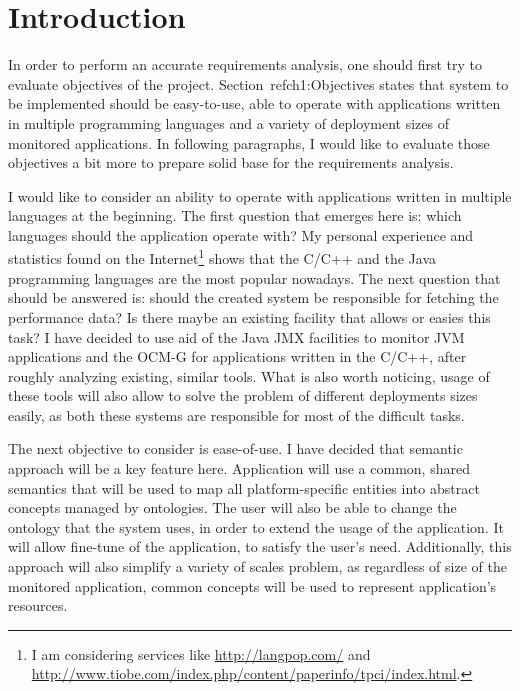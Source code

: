 %

\section{Introduction}
\label{sec:RequirementsIntroduction}

In order to perform an accurate requirements analysis, one should first try to evaluate objectives of the project. Section~ref{ch1:Objectives} states that system to be implemented should be easy-to-use, able to operate with applications written in multiple programming languages and a variety of deployment sizes of monitored applications. In following paragraphs, I would like to evaluate those objectives a bit more to prepare solid base for the requirements analysis.

I would like to consider an ability to operate with applications written in multiple languages at the beginning. The first question that emerges here is: which languages should the application operate with? My personal experience and statistics found on the Internet\footnote{I am considering services like \url{http://langpop.com/} and \url{http://www.tiobe.com/index.php/content/paperinfo/tpci/index.html}.} shows that the C/C++ and the Java programming languages are the most popular nowadays. The next question that should be answered is: should the created system be responsible for fetching the performance data? Is there maybe an existing facility that allows or easies this task? I have decided to use aid of the Java JMX facilities to monitor JVM applications and the OCM-G for applications written in the C/C++, after roughly analyzing existing, similar tools. What is also worth noticing, usage of these tools will also allow to solve the problem of different deployments sizes easily, as both these systems are responsible for most of the difficult tasks.

The next objective to consider is ease-of-use. I have decided that semantic approach will be a key feature here. Application will use a common, shared semantics that will be used to map all platform-specific entities into abstract concepts managed by ontologies. The user will also be able to change the ontology that the system uses, in order to extend the usage of the application. It will allow fine-tune of the application, to satisfy the user\rq{}s need. Additionally, this approach will also simplify a variety of scales problem, as regardless of size of the monitored application, common concepts will be used to represent application\rq{}s resources.

